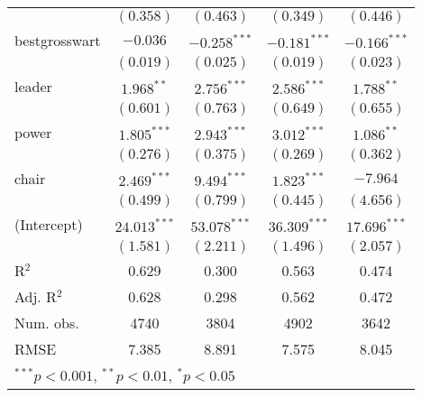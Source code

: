 \documentclass[12pt]{article}
\begin{document}
\begin{table}
\begin{center}
\begin{tabular}{l c c c c }
			& $(0.358)$      & $(0.463)$      & $(0.349)$      & $(0.446)$      \\
			bestgrosswart          & $-0.036$       & $-0.258^{***}$ & $-0.181^{***}$ & $-0.166^{***}$ \\
			& $(0.019)$      & $(0.025)$      & $(0.019)$      & $(0.023)$      \\
			leader                 & $1.968^{**}$   & $2.756^{***}$  & $2.586^{***}$  & $1.788^{**}$   \\
			& $(0.601)$      & $(0.763)$      & $(0.649)$      & $(0.655)$      \\
			power                  & $1.805^{***}$  & $2.943^{***}$  & $3.012^{***}$  & $1.086^{**}$   \\
			& $(0.276)$      & $(0.375)$      & $(0.269)$      & $(0.362)$      \\
			chair                  & $2.469^{***}$  & $9.494^{***}$  & $1.823^{***}$  & $-7.964$       \\
			& $(0.499)$      & $(0.799)$      & $(0.445)$      & $(4.656)$      \\
			(Intercept)            & $24.013^{***}$ & $53.078^{***}$ & $36.309^{***}$ & $17.696^{***}$ \\
			& $(1.581)$      & $(2.211)$      & $(1.496)$      & $(2.057)$      \\
			\hline
			R$^2$                  & 0.629          & 0.300          & 0.563          & 0.474          \\
			Adj. R$^2$             & 0.628          & 0.298          & 0.562          & 0.472          \\
			Num. obs.              & 4740           & 3804           & 4902           & 3642           \\
			RMSE                   & 7.385          & 8.891          & 7.575          & 8.045          \\
			\hline
			\multicolumn{5}{l}{\scriptsize{$^{***}p<0.001$, $^{**}p<0.01$, $^*p<0.05$}}
		\end{tabular}
	\end{center}
\end{table}
\end{document}
